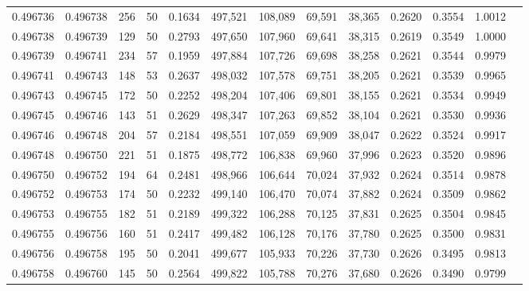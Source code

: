 \begin{tabular}{rrrrrrrrrrrrr}
0.496736 & 0.496738 &   256 &  50 &                                     0.1634 & 497,521 & 108,089 &  69,591 &  38,365 & 0.2620 & 0.3554 & 1.0012 \\
0.496738 & 0.496739 &   129 &  50 &                                     0.2793 & 497,650 & 107,960 &  69,641 &  38,315 & 0.2619 & 0.3549 & 1.0000 \\
0.496739 & 0.496741 &   234 &  57 &                                     0.1959 & 497,884 & 107,726 &  69,698 &  38,258 & 0.2621 & 0.3544 & 0.9979 \\
0.496741 & 0.496743 &   148 &  53 &                                     0.2637 & 498,032 & 107,578 &  69,751 &  38,205 & 0.2621 & 0.3539 & 0.9965 \\
0.496743 & 0.496745 &   172 &  50 &                                     0.2252 & 498,204 & 107,406 &  69,801 &  38,155 & 0.2621 & 0.3534 & 0.9949 \\
0.496745 & 0.496746 &   143 &  51 &                                     0.2629 & 498,347 & 107,263 &  69,852 &  38,104 & 0.2621 & 0.3530 & 0.9936 \\
0.496746 & 0.496748 &   204 &  57 &                                     0.2184 & 498,551 & 107,059 &  69,909 &  38,047 & 0.2622 & 0.3524 & 0.9917 \\
0.496748 & 0.496750 &   221 &  51 &                                     0.1875 & 498,772 & 106,838 &  69,960 &  37,996 & 0.2623 & 0.3520 & 0.9896 \\
0.496750 & 0.496752 &   194 &  64 &                                     0.2481 & 498,966 & 106,644 &  70,024 &  37,932 & 0.2624 & 0.3514 & 0.9878 \\
0.496752 & 0.496753 &   174 &  50 &                                     0.2232 & 499,140 & 106,470 &  70,074 &  37,882 & 0.2624 & 0.3509 & 0.9862 \\
0.496753 & 0.496755 &   182 &  51 &                                     0.2189 & 499,322 & 106,288 &  70,125 &  37,831 & 0.2625 & 0.3504 & 0.9845 \\
0.496755 & 0.496756 &   160 &  51 &                                     0.2417 & 499,482 & 106,128 &  70,176 &  37,780 & 0.2625 & 0.3500 & 0.9831 \\
0.496756 & 0.496758 &   195 &  50 &                                     0.2041 & 499,677 & 105,933 &  70,226 &  37,730 & 0.2626 & 0.3495 & 0.9813 \\
0.496758 & 0.496760 &   145 &  50 &                                     0.2564 & 499,822 & 105,788 &  70,276 &  37,680 & 0.2626 & 0.3490 & 0.9799 \\

\end{tabular}
